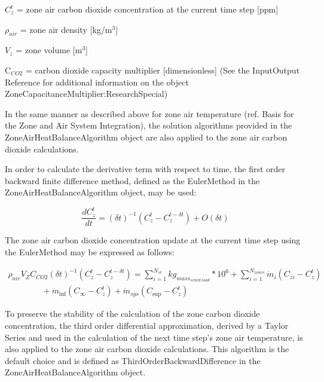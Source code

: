 \(C_z^t\) = zone air carbon dioxide concentration at the current time step {[}ppm{]}

\({\rho_{air}}\) = zone air density {[}kg/m\(^{3}\){]}

\({V_z}\) = zone volume {[}m\(^{3}\){]}

C\(_{CO2}\) = carbon dioxide capacity multiplier {[}dimensionless{]} (See the InputOutput Reference for additional information on the object ZoneCapacitanceMultiplier:ResearchSpecial)

In the same manner as described above for zone air temperature (ref. Basis for the Zone and Air System Integration), the solution algorithms provided in the ZoneAirHeatBalanceAlgorithm object are also applied to the zone air carbon dioxide calculations.

In order to calculate the derivative term with respect to time, the first order backward finite difference method, defined as the EulerMethod in the ZoneAirHeatBalanceAlgorithm object, may be used:

\begin{equation}
\frac{{dC_z^t}}{{dt}} = {\left( {\delta t} \right)^{ - 1}}(C_z^t - C_z^{t - \delta t}) + O(\delta t)
\end{equation}

The zone air carbon dioxide concentration update at the current time step using the EulerMethod may be expressed as follows:

\begin{equation}
\begin{array}{l}
{\rho_{air}}{V_Z}{C_{CO2}}{\left( {\delta t} \right)^{ - 1}}\left( {C_z^t - C_z^{t - \delta t}} \right) = \sum\limits_{i = 1}^{{N_{sl}}} {k{g_{mas{s_{sched\;load}}}}} *{10^6} + \sum\limits_{i = 1}^{{N_{zones}}} {{{\dot m}_i}} \left( {{C_{zi}} - C_z^t} \right) \\
\quad \quad \quad \quad + {\dot m_{\inf }}\left( {{C_\infty } - C_z^t} \right) + {\dot m_{sys}}\left( {{C_{\sup }} - C_z^t} \right)
\end{array}
\end{equation}

To preserve the stability of the calculation of the zone carbon dioxide concentration, the third order differential approximation, derived by a Taylor Series and used in the calculation of the next time step's zone air temperature, is also applied to the zone air carbon dioxide calculations. This algorithm is the default choice and is defined as ThirdOrderBackwardDifference in the ZoneAirHeatBalanceAlgorithm object.

